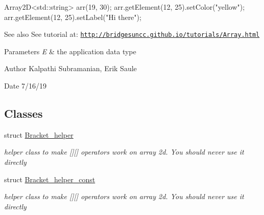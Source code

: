 \begin{DoxyCode}
Array2D<std::string> arr(19, 30);
arr.getElement(12, 25).setColor(\textcolor{stringliteral}{"yellow"});
arr.getElement(12, 25).setLabel(\textcolor{stringliteral}{"Hi there"});
\end{DoxyCode}


\begin{DoxySeeAlso}{See also}
See tutorial at\+: \href{http://bridgesuncc.github.io/tutorials/Array.html}{\tt http\+://bridgesuncc.\+github.\+io/tutorials/\+Array.\+html}
\end{DoxySeeAlso}

\begin{DoxyParams}{Parameters}
{\em E} & the application data type\\
\hline
\end{DoxyParams}
\begin{DoxyAuthor}{Author}
Kalpathi Subramanian, Erik Saule 
\end{DoxyAuthor}
\begin{DoxyDate}{Date}
7/16/19 
\end{DoxyDate}
\subsection*{Classes}
\begin{DoxyCompactItemize}
\item 
struct \mbox{\hyperlink{structbridges_1_1datastructure_1_1_array2_d_1_1_bracket__helper}{Bracket\+\_\+helper}}
\begin{DoxyCompactList}\small\item\em helper class to make \mbox{[}\mbox{]}\mbox{[}\mbox{]} operators work on array 2d. You should never use it directly \end{DoxyCompactList}\item 
struct \mbox{\hyperlink{structbridges_1_1datastructure_1_1_array2_d_1_1_bracket__helper__const}{Bracket\+\_\+helper\+\_\+const}}
\begin{DoxyCompactList}\small\item\em helper class to make \mbox{[}\mbox{]}\mbox{[}\mbox{]} operators work on array 2d. You should never use it directly \end{DoxyCompactList}\end{DoxyCompactItemize}
